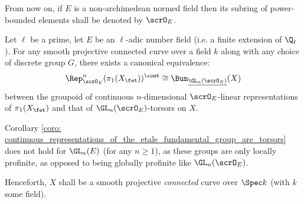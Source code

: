         \begin{convention}
            From now on, if $E$ is a non-archimedean normed field then its subring of power-bounded elements shall be denoted by $\scrO_E$. 
        \end{convention}
        \begin{corollary} \label{coro: continuous_representations_of_the_etale_fundamental_group_are_torsors}
            Let $\ell$ be a prime, let $E$ be an $\ell$-adic number field (i.e. a finite extension of $\Q_{\ell}$). For any smooth projective connected curve over a field $k$ along with any choice of discrete group $G$, there exists a canonical equivalence:
                $$\Rep^n_{\scrO_E}(\pi_1(X_{\fet}))^{\cont} \cong \Bun_{\underline{\GL_n(\scrO_E)}}(X)$$
            between the groupoid of continuous $n$-dimensional $\scrO_E$-linear representations of $\pi_1(X_{\fet})$ and that of $\GL_n(\scrO_E)$-torsors on $X$.
        \end{corollary}
        \begin{remark}
            Corollary \ref{coro: continuous_representations_of_the_etale_fundamental_group_are_torsors} does not hold for $\GL_n(E)$ (for any $n \geq 1$), as these groups are only locally profinite, as opposed to being globally profinite like $\GL_n(\scrO_E)$.
        \end{remark}
    
        \begin{convention} \label{conv: base_curve}
            Henceforth, $X$ shall be a smooth projective \textit{connected} curve over $\Spec k$ (with $k$ some field).
        \end{convention}
        
